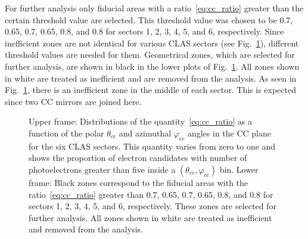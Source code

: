 For further analysis only fiducial areas with a ratio~\eqref{eq:cc_ratio} greater than the certain threshold value are selected. This threshold value was chosen to be 0.7, 0.65, 0.7, 0.65, 0.8, and 0.8 for sectors 1, 2, 3, 4, 5, and 6, respectively. Since inefficient zones are not identical for various CLAS sectors (see Fig.~\ref{fig:ph_vs_th_cc}), different threshold values are needed for them. Geometrical zones, which are selected for further analysis, are shown in black in the lower plots of Fig.~\ref{fig:ph_vs_th_cc}. All zones shown in white are treated as inefficient and are removed from the analysis. As seen in Fig.~\ref{fig:ph_vs_th_cc}, there is an inefficient zone in the middle of each sector. This is expected since two CC mirrors are joined here. 

\begin{figure}[htp]
\begin{center}
\caption{\small Upper frame: Distributions of the quantity~\eqref{eq:cc_ratio} as a function of the polar $\theta_{cc}$ and azimuthal $\varphi_{cc}$ angles in the CC plane for the six CLAS sectors. This quantity varies from zero to one and shows the proportion of electron candidates with number of photoelectrons greater than five inside a $(\theta_{cc},\varphi_{cc})$ bin. Lower frame: Black zones correspond to the fiducial areas with the ratio~\eqref{eq:cc_ratio} greater than 0.7, 0.65, 0.7, 0.65, 0.8, and 0.8 for sectors 1, 2, 3, 4, 5, and 6, respectively. These zones are selected for further analysis. All zones shown in white are treated as inefficient and removed from the analysis.} \label{fig:ph_vs_th_cc}
\end{center}
\end{figure}

